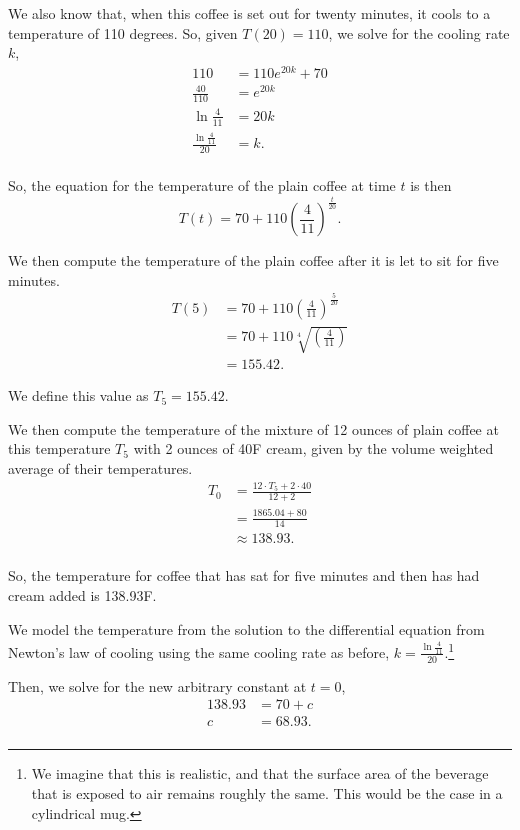 \documentclass[../hw11]{subfiles}
\begin{document}
We also know that, when this coffee is set out for twenty minutes, it cools to a temperature of 110 degrees. So, given $T(20)=110$, we solve for the cooling rate $k$,
\begin{align*}
    110&=110e^{20k}+70 \\
    \frac{40}{110}&=e^{20k} \\
    \ln{\frac{4}{11}}&=20k \\
    \frac{\ln{\frac{4}{11}}}{20}&=k. \\
\end{align*}

So, the equation for the temperature of the plain coffee at time $t$ is then 
\[T(t)=70+110{\left( \frac{4}{11} \right)}^{\frac{t}{20}}.\]

We then compute the temperature of the plain coffee after it is let to sit for five minutes.
\begin{align*}
    T(5)&=70+110{\left( \frac{4}{11} \right)}^{\frac{5}{20}}\\
    &=70+110\sqrt[4]{\left( \frac{4}{11} \right)}\\
    &=155.42.
\end{align*}

We define this value as $T_5=155.42$.

We then compute the temperature of the mixture of 12 ounces of plain coffee at this temperature $T_5$ with 2 ounces of 40F cream, given by the volume weighted average of their temperatures.
\begin{align*}
    T_0&=\frac{12\cdot T_5+2\cdot40}{12+2}\\
    &=\frac{1865.04+80}{14} \\
    &\approx138.93. \\
\end{align*}

So, the temperature for coffee that has sat for five minutes and then has had cream added is 138.93F.

We model the temperature from the solution to the differential equation from Newton’s law of cooling using the same cooling rate as before, $k=\frac{\ln{\frac{4}{11}}}{20}$.\footnote{We imagine that this is realistic, and that the surface area of the beverage that is exposed to air remains roughly the same. This would be the case in a cylindrical mug.}

Then, we solve for the new arbitrary constant at $t=0$,
\begin{align*}
    138.93&=70+c \\
    c&=68.93. \\
\end{align*}
\end{document}
